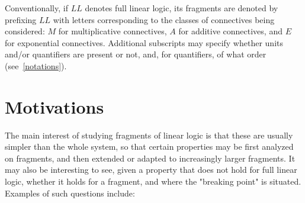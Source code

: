 Conventionally, if \(LL\) denotes full linear logic, its fragments are
denoted by prefixing \(LL\) with letters corresponding to the classes of
connectives being considered: \(M\) for multiplicative connectives,
\(A\) for additive connectives, and \(E\) for exponential connectives.
Additional subscripts may specify whether units and/or quantifiers are
present or not, and, for quantifiers, of what order (see~\cref{notations}).

\section{Motivations}\label{motivations}

The main interest of studying fragments of linear logic is that these
are usually simpler than the whole system, so that certain properties
may be first analyzed on fragments, and then extended or adapted to
increasingly larger fragments. It may also be interesting to see, given
a property that does not hold for full linear logic, whether it holds
for a fragment, and where the "breaking point" is situated. Examples of
such questions include:
